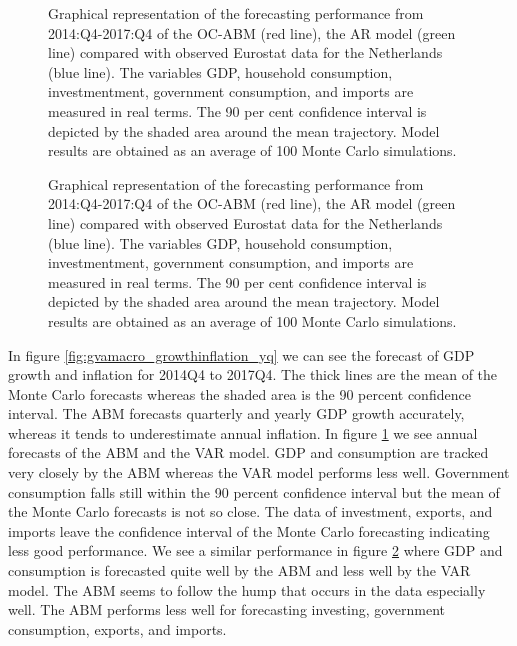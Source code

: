 \begin{figure}[!h]
	\centering
	
	\caption{Graphical representation of the forecasting performance from 2014:Q4-2017:Q4 of the OC-ABM (red line), the AR model (green line) compared with observed Eurostat data for the Netherlands (blue line). The variables GDP, household consumption, investmentment, government consumption, and imports are measured in real terms. The 90 per cent confidence interval is depicted by the shaded area around the mean trajectory. Model results are obtained as an average of 100 Monte Carlo simulations.}     \label{fig:gvamacro_gvaetal_y}
\end{figure}

\begin{figure}[!h]
	\centering
	
 \caption{Graphical representation of the forecasting performance from 2014:Q4-2017:Q4 of the OC-ABM (red line), the AR model (green line) compared with observed Eurostat data for the Netherlands (blue line). The variables GDP, household consumption, investmentment, government consumption, and imports are measured in real terms. The 90 per cent confidence interval is depicted by the shaded area around the mean trajectory. Model results are obtained as an average of 100 Monte Carlo simulations.}
\label{fig:gvamacro_gvaetal_q}
\end{figure}
In figure \ref{fig:gvamacro_growthinflation_yq}
 we can see the forecast of GDP growth and inflation for 2014Q4 to 2017Q4. The thick lines are the mean of the Monte Carlo forecasts whereas the shaded area is the 90 percent confidence interval. The ABM forecasts quarterly and yearly GDP growth accurately, whereas it tends to underestimate annual inflation. In figure   \ref{fig:gvamacro_gvaetal_y}
 we see annual forecasts of the ABM and the VAR model. GDP and consumption are tracked very closely by the ABM whereas the VAR model performs less well. Government consumption falls still within the 90 percent confidence interval but the mean of the Monte Carlo forecasts is not so close. The data of investment, exports, and imports leave the confidence interval of the Monte Carlo forecasting indicating less good performance. We see a similar performance in figure \ref{fig:gvamacro_gvaetal_q} where GDP and consumption is forecasted quite well by the ABM and less well by the VAR model. The ABM seems to follow the hump that occurs in the data especially well. The ABM performs less well for forecasting investing, government consumption, exports, and imports.
 \clearpage
 
